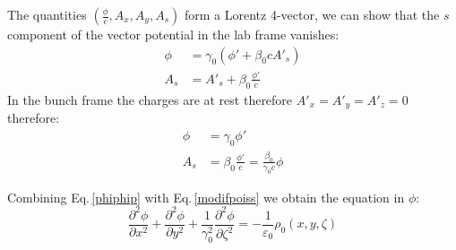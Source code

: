 \documentclass[a4paper,12pt]{report}
\begin{document}
The quantities $\left( \frac{\phi}{c}, A_x, A_y, A_s\right)$ form a Lorentz 4-vector, we can show that the $s$ component of the vector potential in the lab frame vanishes:
\begin{align}
\phi &= \gamma_0 \left( {\phi'} +  \beta_0 c A'_s\right)\\
A_s &= A'_s +\beta_0 \frac{\phi'}{c}
\end{align}
In the bunch frame the charges are at rest therefore $A'_x=A'_y=A'_z=0$ therefore:
\begin{align}
\phi &= \gamma_0 \phi'\label{phiphip}\\
A_s &= \beta_0 \frac{\phi'}{c} =  \frac{\beta_0}{\gamma_0c}\phi
\end{align}

Combining Eq.\,\ref{phiphip} with Eq.\,\ref{modifpoiss} we obtain the equation in $\phi$:
\begin{equation}
\frac{\partial^2 \phi}{\partial x^2} +  \frac{\partial^2 \phi}{\partial y^2}+  \frac{1}{\gamma_0^2}\frac{\partial^2 \phi}{\partial \zeta^2}=  -\frac{1}{\varepsilon_0}{\rho}_0 \left(x, y,\zeta\right) \label{modifpoiss_zeta}
\end{equation}


%
%
\end{document}
